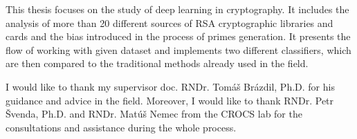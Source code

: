 
 {This thesis focuses on the study of deep learning in cryptography. It includes the analysis of more than 20 different sources of RSA cryptographic libraries and cards and the bias introduced in the process of primes generation. It presents the flow of working with given dataset and implements two different classifiers, which are then compared to the traditional methods already used in the field.}

 {I would like to thank my supervisor doc. RNDr. Tomáš Brázdil, Ph.D. for his guidance and advice in the field. Moreover, I would like to thank RNDr. Petr Švenda, Ph.D. and RNDr. Matúš Nemec from the CROCS lab for the consultations and assistance during the whole process.}
